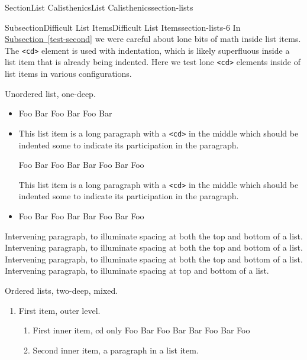 \documentclass[twoside,10pt,]{article}
\newcommand{\xreffont}{\relax}
\newcommand{\mono}[1]{\texttt{#1}}
\numberwithin{equation}{section}
\begin{document}
\begin{sectionptx}{Section}{List Calisthenics}{}{List Calisthenics}{}{}{section-lists}
\typeout{************************************************}
%
\begin{subsectionptx}{Subsection}{Difficult List Items}{}{Difficult List Items}{}{}{section-lists-6}
In \hyperref[test-second]{Subsection~{\xreffont\ref{test-second}}} we were careful about lone bits of math inside list items.  The \mono{<cd>} element is used with indentation, which is likely superfluous inside a list item that is already being indented.  Here we test lone \mono{<cd>} elements inside of list items in various configurations.%
\par
Unordered list, one-deep.%
\begin{itemize}[label=\textbullet]
\item{}%
\begin{codedisplayleft}
Foo Bar Foo
Bar Foo Bar
\end{codedisplayleft}
%
\item{}This list item is a long paragraph with a \mono{<cd>} in the middle which should be indented some to indicate its participation in the paragraph.%
\begin{codedisplay}
Foo Bar Foo
Bar
Bar Foo Bar
Foo
\end{codedisplay}
This list item is a long paragraph with a \mono{<cd>} in the middle which should be indented some to indicate its participation in the paragraph.%
\item{}%
\begin{codedisplayleft}
Foo Bar Foo
Bar
Bar Foo Bar
Foo
\end{codedisplayleft}
%
\end{itemize}
%
\par
Intervening paragraph, to illuminate spacing at both the top and bottom of a list.  Intervening paragraph, to illuminate spacing at both the top and bottom of a list.  Intervening paragraph, to illuminate spacing at both the top and bottom of a list.  Intervening paragraph, to illuminate spacing at top and bottom of a list.%
\par
Ordered lists, two-deep, mixed.%
\begin{enumerate}
\item{}First item, outer level.%
\begin{enumerate}
\item{}%
\begin{codedisplayleft}
First inner item, cd only
Foo Bar Foo
Bar
Bar Foo Bar
Foo
\end{codedisplayleft}
%
\item{}Second inner item, a paragraph in a list item.%

\end{enumerate}
\end{enumerate}
\end{subsectionptx}
\end{sectionptx}
\end{document}
